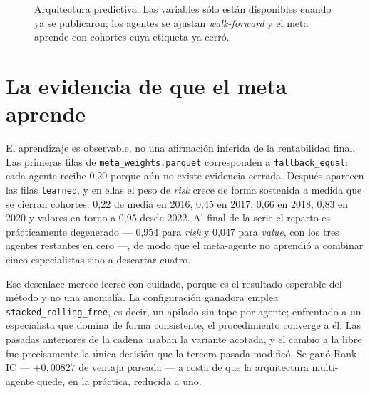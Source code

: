\begin{figure}[H]
  \centering
  \caption{Arquitectura predictiva. Las variables sólo están disponibles cuando ya se publicaron;
  los agentes se ajustan \textit{walk-forward} y el meta aprende con cohortes cuya etiqueta ya cerró.}
  \label{fig:arquitectura}
\end{figure}

\section{La evidencia de que el meta aprende}

El aprendizaje es observable, no una afirmación inferida de la rentabilidad final. Las primeras
filas de \texttt{meta\_weights.parquet} corresponden a \texttt{fallback\_equal}: cada agente recibe
0,20 porque aún no existe evidencia cerrada. Después aparecen las filas \texttt{learned}, y en ellas
el peso de \textit{risk} crece de forma sostenida a medida que se cierran cohortes: 0,22 de media en
2016, 0,45 en 2017, 0,66 en 2018, 0,83 en 2020 y valores en torno a 0,95 desde 2022. Al final de la
serie el reparto es prácticamente degenerado --- 0,954 para \textit{risk} y 0,047 para
\textit{value}, con los tres agentes restantes en cero ---, de modo que el meta-agente no aprendió a
combinar cinco especialistas sino a descartar cuatro.

Ese desenlace merece leerse con cuidado, porque es el resultado esperable del método y no una
anomalía. La configuración ganadora emplea \texttt{stacked\_rolling\_free}, es decir, un apilado sin
tope por agente; enfrentado a un especialista que domina de forma consistente, el procedimiento
converge a él. Las pasadas anteriores de la cadena usaban la variante acotada, y el cambio a la
libre fue precisamente la única decisión que la tercera pasada modificó. Se ganó Rank-IC ---
$+0{,}00827$ de ventaja pareada --- a costa de que la arquitectura multi-agente quede, en la
práctica, reducida a uno.

